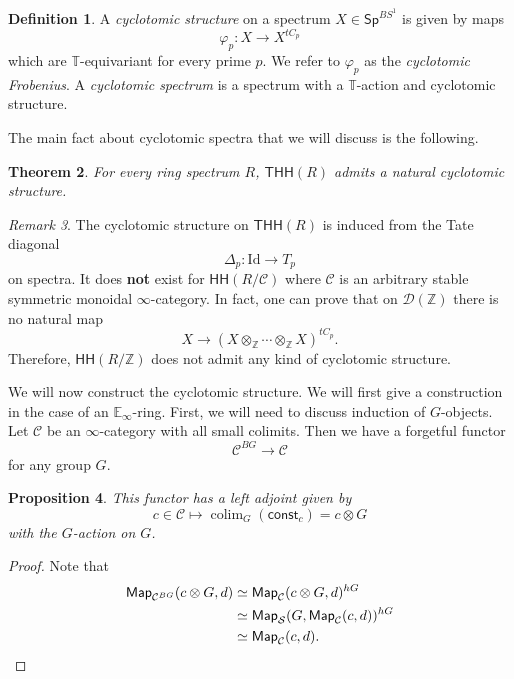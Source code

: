 \documentclass[10pt, oneside]{memoir}
\newtheorem{thm}{Theorem}[subsection]
\newtheorem{prop}[thm]{Proposition}
\theoremstyle{definition}
\newtheorem{defn}[thm]{Definition}
\theoremstyle{remark}
\newtheorem{rmk}[thm]{Remark}
\theoremstyle{plain}
\theoremstyle{definition}
\theoremstyle{remark}
\newcommand{\Z}{\mathbb{Z}}
\newcommand{\E}{\mathbb{E}}
\newcommand{\mc}[1]{\mathcal{#1}}
\newcommand{\T}{\mathbb{T}}
\newcommand{\mr}[1]{\mathrm{#1}}
\newcommand{\ms}[1]{\mathsf{#1}}
\newcommand{\1}{\mathbf{1}}
\newcommand{\2}{\mathbf{2}}
\newcommand{\3}{\mathbf{3}}
\newcommand{\THH}{\ms{THH}}
\newcommand{\HH}{\ms{HH}}
\DeclareMathOperator*{\colim}{colim}
\begin{document}
\begin{defn}
    A \textit{cyclotomic structure} on a spectrum \(X \in \ms{Sp}^{BS^1} \) is given by maps
    \[ \varphi_p \colon X \to X^{tC_p} \]
    which are \(\T \)-equivariant for every prime \(p \). We refer to \(\varphi_p \) as the \textit{cyclotomic Frobenius}. A \textit{cyclotomic spectrum} is a spectrum with a \(\T \)-action and cyclotomic structure.
\end{defn}

The main fact about cyclotomic spectra that we will discuss is the following.
\begin{thm}
    For every ring spectrum \(R \), \(\THH(R) \) admits a natural cyclotomic structure.
\end{thm}

\begin{rmk}
    The cyclotomic structure on \(\THH(R) \) is induced from the Tate diagonal
    \[ \Delta_p \colon \mr{Id} \to T_p \]
    on spectra. It does \textbf{not} exist for \(\HH(R/\mc{C}) \) where \(\mc{C} \) is an arbitrary stable symmetric monoidal \(\infty \)-category. In fact, one can prove that on \(\mc{D}(\Z) \) there is no natural map
    \[ X \to (X \otimes_{\Z} \cdots \otimes_{\Z} X)^{t C_p}. \]
    Therefore, \(\HH(R/\Z) \) does not admit any kind of cyclotomic structure.
\end{rmk}

We will now construct the cyclotomic structure. We will first give a construction in the case of an \(\E_{\infty} \)-ring. First, we will need to discuss induction of \(G \)-objects. Let \(\mc{C} \) be an \(\infty \)-category with all small colimits. Then we have a forgetful functor
\[ \mc{C}^{BG} \to \mc{C} \]
for any group \(G \).

\begin{prop}
    This functor has a left adjoint given by
    \[ c \in \mc{C} \mapsto \colim_G (\ms{const}_c) = c \otimes G \]
    with the \(G \)-action on \(G \).
\end{prop}

\begin{proof}
    Note that
    \begin{align*}
        \ms{Map}_{\mc{C}^{BG}}(c \otimes G, d) &\simeq \ms{Map}_{\mc{C}}(c \otimes G, d)^{hG} \\
        &\simeq \ms{Map}_{\mc{S}}(G, \ms{Map}_{\mc{C}}(c, d))^{hG} \\
        &\simeq \ms{Map}_{\mc{C}}(c, d). \qedhere
    \end{align*}
\end{proof}
\end{document}
